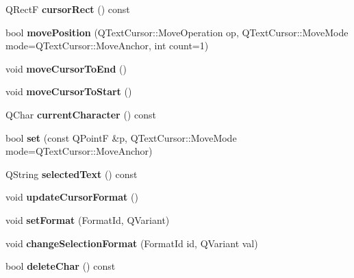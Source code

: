 \begin{DoxyCompactItemize}
\item 
\mbox{\label{class_ms_1_1_text_cursor_a4edbcbcd5699b08957c2869c32af433e}} 
Q\+RectF {\bfseries cursor\+Rect} () const
\item 
\mbox{\label{class_ms_1_1_text_cursor_a439cb66d9dee88efcb7eac95d1d27278}} 
bool {\bfseries move\+Position} (Q\+Text\+Cursor\+::\+Move\+Operation op, Q\+Text\+Cursor\+::\+Move\+Mode mode=Q\+Text\+Cursor\+::\+Move\+Anchor, int count=1)
\item 
\mbox{\label{class_ms_1_1_text_cursor_ab8424730fd4d7c926e0ca7f0020806ce}} 
void {\bfseries move\+Cursor\+To\+End} ()
\item 
\mbox{\label{class_ms_1_1_text_cursor_ad1718e31a506c4eb068bc388ce3baf2d}} 
void {\bfseries move\+Cursor\+To\+Start} ()
\item 
\mbox{\label{class_ms_1_1_text_cursor_a9c071cc868c3eed63e583375b78e16ec}} 
Q\+Char {\bfseries current\+Character} () const
\item 
\mbox{\label{class_ms_1_1_text_cursor_ad8409e8a8e642f285e45314bf874ac16}} 
bool {\bfseries set} (const Q\+PointF \&p, Q\+Text\+Cursor\+::\+Move\+Mode mode=Q\+Text\+Cursor\+::\+Move\+Anchor)
\item 
\mbox{\label{class_ms_1_1_text_cursor_a161e91c25d9d8f9ca32eb09088f64747}} 
Q\+String {\bfseries selected\+Text} () const
\item 
\mbox{\label{class_ms_1_1_text_cursor_a1e8b8c3ad319d812ef6d782e06a532a8}} 
void {\bfseries update\+Cursor\+Format} ()
\item 
\mbox{\label{class_ms_1_1_text_cursor_a1156d0d63e730d3c343b7ce7679efc1b}} 
void {\bfseries set\+Format} (Format\+Id, Q\+Variant)
\item 
\mbox{\label{class_ms_1_1_text_cursor_a408a6304eb31a7ab848a6c3f6250ea45}} 
void {\bfseries change\+Selection\+Format} (Format\+Id id, Q\+Variant val)
\item 
\mbox{\label{class_ms_1_1_text_cursor_aff7bcbf2047ad77f4aa07f35e96cc824}} 
bool {\bfseries delete\+Char} () const
\end{DoxyCompactItemize}



